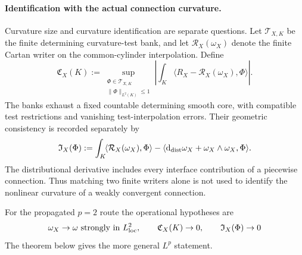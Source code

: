 \documentclass[11pt]{article}
\numberwithin{equation}{section}
\theoremstyle{definition}
\theoremstyle{remark}
\newcommand{\dd}{\mathrm d}
\begin{document}
\paragraph{Identification with the actual connection curvature.}
Curvature size and curvature identification are separate questions.  Let
$\mathcal T_{X,K}$ be the finite determining curvature-test bank, and let
$\mathcal R_X(\omega_X)$ denote the finite Cartan writer on the common-cylinder
interpolation.  Define
\begin{equation}
 \mathfrak C_X(K):=
 \sup_{\substack{\Phi\in\mathcal T_{X,K}\\\|\Phi\|_{L^2(K)}\le1}}
 \left|\int_K\!\langle R_X-\mathcal R_X(\omega_X),\Phi\rangle\right|.
 \label{eq:main-cartan-curvature-residual}
\end{equation}
The banks exhaust a fixed countable determining smooth core, with compatible
test restrictions and vanishing test-interpolation errors.  Their geometric
consistency is recorded separately by
\begin{equation}
 \mathfrak I_X(\Phi):=
 \int_K\!\langle\mathcal R_X(\omega_X),\Phi\rangle
 -\langle\dd_{\rm dist}\omega_X+\omega_X\wedge\omega_X,\Phi\rangle.
 \label{eq:main-cartan-incidence}
\end{equation}
The distributional derivative includes every interface contribution of a
piecewise connection.  Thus matching two finite writers alone is not used to
identify the nonlinear curvature of a weakly convergent connection.

For the propagated $p=2$ route the operational hypotheses are
\begin{equation}
 \omega_X\to\omega\ \hbox{strongly in }L^2_{\rm loc},\qquad
 \mathfrak C_X(K)\to0,\qquad
 \mathfrak I_X(\Phi)\to0
 \label{eq:main-identified-curvature-hypotheses}
\end{equation}
The theorem below gives the more general $L^p$ statement.
\end{document}
